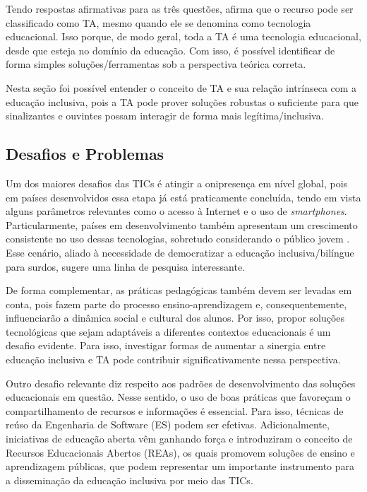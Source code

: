 Tendo respostas afirmativas para as três questões,  afirma que o recurso pode ser classificado como TA, mesmo quando ele se denomina como tecnologia educacional. Isso porque, de modo geral, toda a TA é uma tecnologia educacional, desde que esteja no domínio da educação. Com isso, é possível identificar de forma simples soluções/ferramentas sob a perspectiva teórica correta.

Nesta seção foi possível entender o conceito de TA e sua relação intrínseca com a educação inclusiva, pois a TA pode prover soluções robustas o suficiente para que sinalizantes e ouvintes possam interagir de forma mais legítima/inclusiva. %

\subsection{Desafios e Problemas}
\label{fundamentacao-teorica:tic:desafios}

Um dos maiores desafios das TICs é atingir a onipresença em nível global, pois em países desenvolvidos essa etapa já está praticamente concluída, tendo em vista alguns parâmetros relevantes como o acesso à Internet e o uso de \textit{smartphones}. Particularmente, países em desenvolvimento também apresentam um crescimento consistente no uso dessas tecnologias, sobretudo considerando o público jovem \cite{Itu2020}. Esse cenário, aliado à necessidade de democratizar a educação inclusiva/bilíngue para surdos, sugere uma linha de pesquisa interessante.

De forma complementar, as práticas pedagógicas também devem ser levadas em conta, pois fazem parte do processo ensino-aprendizagem e, consequentemente, influenciarão a dinâmica social e cultural dos alunos. Por isso, propor soluções tecnológicas que sejam adaptáveis a diferentes contextos educacionais é um desafio evidente. Para isso, investigar formas de aumentar a sinergia entre educação inclusiva e TA pode contribuir significativamente nessa perspectiva.

Outro desafio relevante diz respeito aos padrões de desenvolvimento das soluções educacionais em questão. Nesse sentido, o uso de boas práticas que favoreçam o compartilhamento de recursos e informações é essencial. Para isso, técnicas de reúso da Engenharia de Software (ES) podem ser efetivas. Adicionalmente, iniciativas de educação aberta vêm ganhando força e introduziram o conceito de Recursos Educacionais Abertos (REAs), os quais promovem soluções de ensino e aprendizagem públicas, que podem representar um importante instrumento para a disseminação da educação inclusiva por meio das TICs.

